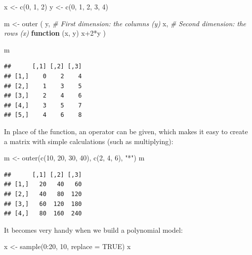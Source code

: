 \documentclass[
]{book}
\newenvironment{Shaded}{\begin{snugshade}}{\end{snugshade}}
\newcommand{\AttributeTok}[1]{\textcolor[rgb]{0.77,0.63,0.00}{#1}}
\newcommand{\CommentTok}[1]{\textcolor[rgb]{0.56,0.35,0.01}{\textit{#1}}}
\newcommand{\ConstantTok}[1]{\textcolor[rgb]{0.00,0.00,0.00}{#1}}
\newcommand{\ControlFlowTok}[1]{\textcolor[rgb]{0.13,0.29,0.53}{\textbf{#1}}}
\newcommand{\DecValTok}[1]{\textcolor[rgb]{0.00,0.00,0.81}{#1}}
\newcommand{\FunctionTok}[1]{\textcolor[rgb]{0.00,0.00,0.00}{#1}}
\newcommand{\NormalTok}[1]{#1}
\newcommand{\OtherTok}[1]{\textcolor[rgb]{0.56,0.35,0.01}{#1}}
\newcommand{\SpecialCharTok}[1]{\textcolor[rgb]{0.00,0.00,0.00}{#1}}
\newcommand{\StringTok}[1]{\textcolor[rgb]{0.31,0.60,0.02}{#1}}
\begin{document}
\begin{Shaded}
\begin{Highlighting}[]
\NormalTok{x }\OtherTok{\textless{}{-}} \FunctionTok{c}\NormalTok{(}\DecValTok{0}\NormalTok{, }\DecValTok{1}\NormalTok{, }\DecValTok{2}\NormalTok{)}
\NormalTok{y }\OtherTok{\textless{}{-}} \FunctionTok{c}\NormalTok{(}\DecValTok{0}\NormalTok{, }\DecValTok{1}\NormalTok{, }\DecValTok{2}\NormalTok{, }\DecValTok{3}\NormalTok{, }\DecValTok{4}\NormalTok{)}

\NormalTok{m }\OtherTok{\textless{}{-}} \FunctionTok{outer}\NormalTok{ (}
\NormalTok{   y,     }\CommentTok{\# First dimension:  the columns (y)}
\NormalTok{   x,     }\CommentTok{\# Second dimension: the rows    (x)}
   \ControlFlowTok{function}\NormalTok{ (x, y)   x}\SpecialCharTok{+}\DecValTok{2}\SpecialCharTok{*}\NormalTok{y}
\NormalTok{)}

\NormalTok{m}
\end{Highlighting}
\end{Shaded}

\begin{verbatim}
##      [,1] [,2] [,3]
## [1,]    0    2    4
## [2,]    1    3    5
## [3,]    2    4    6
## [4,]    3    5    7
## [5,]    4    6    8
\end{verbatim}

In place of the function, an operator can be given, which makes it easy to create a matrix with simple calculations (such as multiplying):

\begin{Shaded}
\begin{Highlighting}[]
\NormalTok{m }\OtherTok{\textless{}{-}} \FunctionTok{outer}\NormalTok{(}\FunctionTok{c}\NormalTok{(}\DecValTok{10}\NormalTok{, }\DecValTok{20}\NormalTok{, }\DecValTok{30}\NormalTok{, }\DecValTok{40}\NormalTok{), }\FunctionTok{c}\NormalTok{(}\DecValTok{2}\NormalTok{, }\DecValTok{4}\NormalTok{, }\DecValTok{6}\NormalTok{), }\StringTok{"*"}\NormalTok{)}
\NormalTok{m}
\end{Highlighting}
\end{Shaded}

\begin{verbatim}
##      [,1] [,2] [,3]
## [1,]   20   40   60
## [2,]   40   80  120
## [3,]   60  120  180
## [4,]   80  160  240
\end{verbatim}

It becomes very handy when we build a polynomial model:

\begin{Shaded}
\begin{Highlighting}[]
\NormalTok{x }\OtherTok{\textless{}{-}} \FunctionTok{sample}\NormalTok{(}\DecValTok{0}\SpecialCharTok{:}\DecValTok{20}\NormalTok{, }\DecValTok{10}\NormalTok{, }\AttributeTok{replace =} \ConstantTok{TRUE}\NormalTok{)}
\NormalTok{x}
\end{Highlighting}
\end{Shaded}
\end{document}
